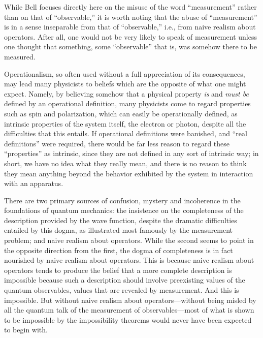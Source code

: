 \documentclass[12pt]{article}
\newcommand{\wf}{wave function}
\newcommand{\nrao}{naive realism about operators}
\begin{document}
While Bell focuses directly here on the misuse of the word
``measurement'' rather than on that of ``observable,'' it is worth
noting that the abuse of ``measurement'' is in a sense inseparable
{}from that of ``observable,'' i.e., {}from naive realism about
operators.  After all, one would not be very likely to speak of
measurement unless one thought that something, some ``observable''
that is, was somehow there to be measured.

Operationalism, so often used without a full appreciation of its
consequences, may lead many physicists to beliefs which are the
opposite of what one might expect.  Namely, by believing somehow that
a physical property {\it is} and {\it must be} defined by an
operational definition, many physicists come to regard properties such
as spin and polarization, which can easily be operationally defined,
as intrinsic properties of the system itself, the electron or photon,
despite all the difficulties that this entails.  If operational
definitions were banished, and ``real definitions'' were required,
there would be far less reason to regard these ``properties'' as
intrinsic, since they are not defined in any sort of intrinsic way; in
short, we have no idea what they really mean, and there is no reason
to think they mean anything beyond the behavior exhibited by the
system in interaction with an apparatus.  \medskip

There are two primary sources of confusion, mystery and incoherence in
the foundations of quantum mechanics: the insistence on the
completeness of the description provided by the \wf{}, despite the
dramatic difficulties entailed by this dogma, as illustrated most
famously by the measurement problem; and \nrao{}. While the second
seems to point in the opposite direction {}from the first, the dogma
of completeness is in fact nourished by \nrao{}. This is because
\nrao{} tends to produce the belief that a more complete description
is impossible because such a description should involve preexisting
values of the quantum observables, values that are revealed by
measurement. And this is impossible. But without \nrao{}---without
being misled by all the quantum talk of the measurement of
observables---most of what is shown to be impossible by the
impossibility theorems would never have been expected to begin with.

\end{document}
